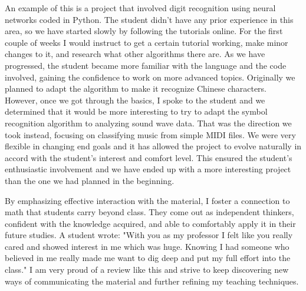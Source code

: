 \documentclass[11pt]{article}
\begin{document}
An example of this is a project that involved digit recognition using neural networks coded in Python. The student didn't have any prior experience in this area, so we have started slowly by following the tutorials online. For the first couple of weeks I would instruct to get a certain tutorial working, make minor changes to it, and research what other algorithms there are.
As we have progressed, the student became more familiar with the language and the code involved, gaining the confidence to work on more advanced topics. Originally we planned to adapt the algorithm to make it recognize Chinese characters. However, once we got through the basics, I spoke to the student and we determined that it would be more interesting to try to adapt the symbol recognition algorithm to analyzing sound wave data. That was the direction we took instead, focusing on classifying music from simple MIDI files. We were very flexible in changing end goals and it has allowed the project to evolve naturally in accord with the student's interest and comfort level.
This ensured the student's enthusiastic involvement and we have ended up with a more interesting project than the one we had planned in the beginning.


By emphasizing effective interaction with the material, I foster a connection to math that students carry beyond class. They come out as independent thinkers, confident with the knowledge acquired, and able to comfortably apply it in their future studies. A student wrote: "With you as my professor I felt like you really cared and showed interest in me which was huge.
Knowing I had someone who believed in me really made me want to dig deep and put my full effort into the class." I am very proud of a review like this and strive to keep discovering new ways of communicating the material and further refining my teaching techniques.
\end{document}

